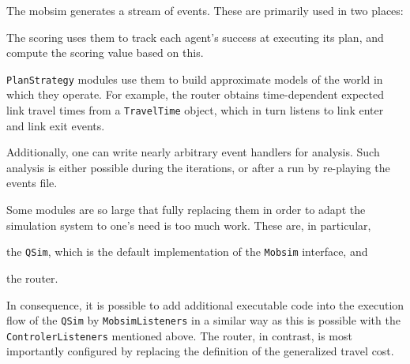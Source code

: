 The \gls{mobsim} generates a stream of \glspl{event}. These are primarily used in two places:
\begin{compactitem}
\item The scoring uses them to track each agent's success at executing its plan, and compute the scoring value based on this.
\item \lstinline|PlanStrategy| modules use them to build approximate models of the world in which they operate.  For example, the router obtains time-dependent expected link travel times from a \lstinline|TravelTime| object, which in turn listens to link enter and link exit events.
  
\end{compactitem}
Additionally, one can write nearly arbitrary event handlers for analysis.
Such analysis is either possible during the iterations, or after a run by re-playing the events file.

Some modules are so large that fully replacing them in order to adapt the simulation system to one's need is too much work. These are, in particular,
\begin{compactitem}
\item the \lstinline|QSim|, which is the default implementation of the \lstinline|Mobsim| interface, and
\item the router.
\end{compactitem}
In consequence, it is possible to add %
additional executable code
into the execution flow of the \lstinline|QSim| by \lstinline|MobsimListeners| in a similar way as this is possible with the \lstinline|ControlerListeners| mentioned above.
%
The router, in contrast, is most importantly configured by replacing the definition of the generalized travel cost. 


